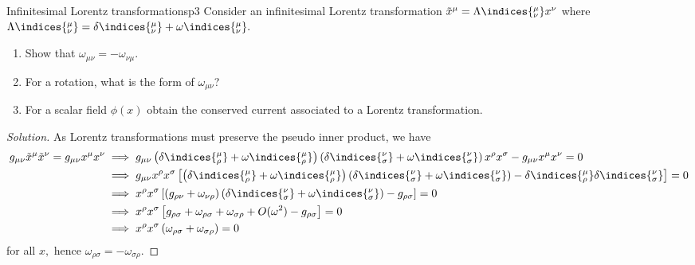 \begin{problem}{Infinitesimal Lorentz transformations}{p3}
   Consider an infinitesimal Lorentz transformation \(\tilde{x}^\mu = \Lambda\indices{^\mu_\nu}x^\nu\) where \(\Lambda\indices{^\mu_\nu} = \delta\indices{^\mu_\nu} + \omega\indices{^\mu_\nu}.\)
   \begin{enumerate}[label=(\alph*)]
      \item Show that \(\omega_{\mu\nu} = -\omega_{\nu\mu}\).
      \item For a rotation, what is the form of \(\omega_{\mu\nu}\)?
      \item For a scalar field \(\phi(x)\) obtain the conserved current associated to a Lorentz transformation.
   \end{enumerate}
\end{problem}
\begin{proof}[Solution]
    As Lorentz transformations must preserve the pseudo inner product, we have
    \begin{align*}
       g_{\mu\nu} \tilde{x}^\mu \tilde{x}^\nu = g_{\mu\nu}x^\mu x^\nu 
       &\implies g_{\mu\nu}\left(\delta\indices{^\mu_\rho} + \omega\indices{^\mu_\rho}\right) \left(\delta\indices{^\nu_\sigma} + \omega\indices{^\nu_\sigma}\right) x^\rho x^\sigma - g_{\mu\nu} x^{\mu} x^\nu = 0\\
       &\implies g_{\mu\nu}x^\rho x^\sigma \left[\left(\delta\indices{^\mu_\rho} + \omega\indices{^\mu_\rho}\right) \left(\delta\indices{^\nu_\sigma} + \omega\indices{^\nu_\sigma}\right) - \delta\indices{^\mu_\rho} \delta\indices{^\nu_\sigma}\right] = 0\\
       &\implies x^\rho x^\sigma \left[\left(g_{\rho \nu} + \omega_{\nu \rho}\right)\left(\delta\indices{^\nu_\sigma} + \omega\indices{^\nu_\sigma}\right) - g_{\rho\sigma}\right] = 0\\
       &\implies x^\rho x^\sigma \left[g_{\rho\sigma} + \omega_{\rho \sigma} + \omega_{\sigma \rho} + O(\omega^2) - g_{\rho \sigma}\right] = 0\\
       &\implies x^\rho x^\sigma \left(\omega_{\rho \sigma} + \omega_{\sigma \rho}\right) = 0
    \end{align*}
    for all \(x,\) hence \(\omega_{\rho \sigma} = -\omega_{\sigma \rho}\).


\end{proof}
